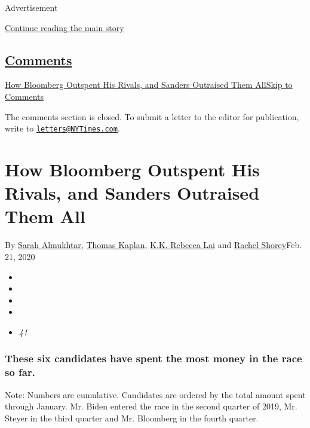 Advertisement

\protect\hyperlink{after-top}{Continue reading the main story}

\hypertarget{comments}{%
\subsection{\texorpdfstring{\protect\hyperlink{commentsContainer}{Comments}}{Comments}}\label{comments}}

\href{}{How Bloomberg Outspent His Rivals, and Sanders Outraised Them
All}\href{}{Skip to Comments}

The comments section is closed. To submit a letter to the editor for
publication, write to
\href{mailto:letters@NYTimes.com}{\nolinkurl{letters@NYTimes.com}}.

\hypertarget{how-bloomberg-outspent-his-rivals-and-sanders-outraised-them-all}{%
\section{How Bloomberg Outspent His Rivals, and Sanders Outraised Them
All}\label{how-bloomberg-outspent-his-rivals-and-sanders-outraised-them-all}}

By \href{https://www.nytimes3xbfgragh.onion/by/sarah-almukhtar}{Sarah
Almukhtar},
\href{https://www.nytimes3xbfgragh.onion/by/thomas-kaplan}{Thomas
Kaplan},
\href{https://www.nytimes3xbfgragh.onion/by/kk-rebecca-lai}{K.K. Rebecca
Lai} and
\href{https://www.nytimes3xbfgragh.onion/by/rachel-shorey}{Rachel
Shorey}Feb. 21, 2020

\begin{itemize}
\item
\item
\item
\item
\item
  \emph{41}
\end{itemize}

\hypertarget{these-six-candidates-have-spent-the-most-money-in-the-race-so-far}{%
\subsubsection{These six candidates have spent the most money in the
race so
far.}\label{these-six-candidates-have-spent-the-most-money-in-the-race-so-far}}

Note: Numbers are cumulative. Candidates are ordered by the total amount
spent through January. Mr. Biden entered the race in the second quarter
of 2019, Mr. Steyer in the third quarter and Mr. Bloomberg in the fourth
quarter.

